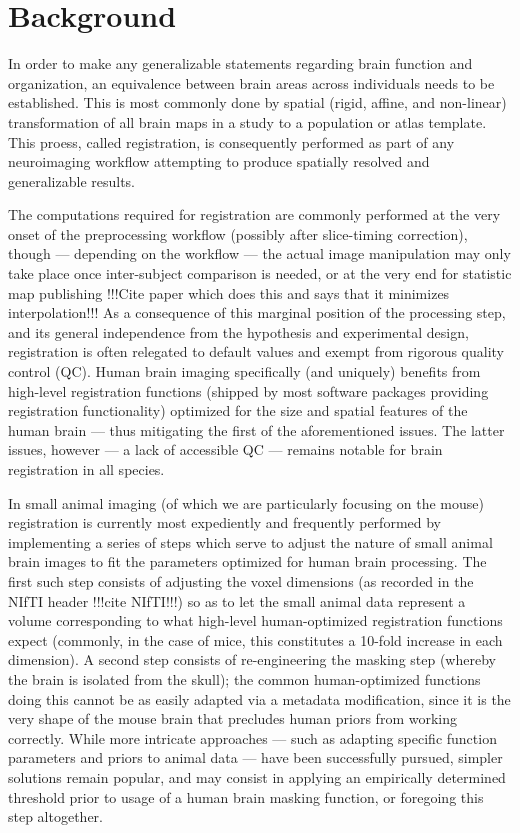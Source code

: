 \section{Background}

In order to make any generalizable statements regarding brain function and organization, an equivalence between brain areas across individuals needs to be established.
This is most commonly done by spatial (rigid, affine, and non-linear) transformation of all brain maps in a study to a population or atlas template.
This proess, called registration, is consequently performed as part of any neuroimaging workflow attempting to produce spatially resolved and generalizable results.

The computations required for registration are commonly performed at the very onset of the preprocessing workflow (possibly after slice-timing correction),
though --- depending on the workflow --- the actual image manipulation may only take place once inter-subject comparison is needed, or at the very end for statistic map publishing !!!Cite paper which does this and says that it minimizes interpolation!!!
As a consequence of this marginal position of the processing step, and its general independence from the hypothesis and experimental design, registration is often relegated to default values and exempt from rigorous quality control (QC).
Human brain imaging specifically (and uniquely) benefits from high-level registration functions (shipped by most software packages providing registration functionality) optimized for the size and spatial features of the human brain --- thus mitigating the first of the aforementioned issues.
The latter issues, however --- a lack of accessible QC --- remains notable for brain registration in all species.

In small animal imaging (of which we are particularly focusing on the mouse) registration is currently most expediently and frequently performed by implementing a series of steps which serve to adjust the nature of small animal brain images to fit the parameters optimized for human brain processing.
The first such step consists of adjusting the voxel dimensions (as recorded in the NIfTI header !!!cite NIfTI!!!) so as to let the small animal data represent a volume corresponding to what high-level human-optimized registration functions expect (commonly, in the case of mice, this constitutes a 10-fold increase in each dimension).	
A second step consists of re-engineering the masking step (whereby the brain is isolated from the skull); the common human-optimized functions doing this cannot be as easily adapted via a metadata modification, since it is the very shape of the mouse brain that precludes human priors from working correctly.
While more intricate approaches --- such as adapting specific function parameters and priors to animal data \cite{rbet} --- have been successfully pursued, simpler solutions remain popular, and may consist in applying an empirically determined threshold prior to usage of a human brain masking function, or foregoing this step altogether.



